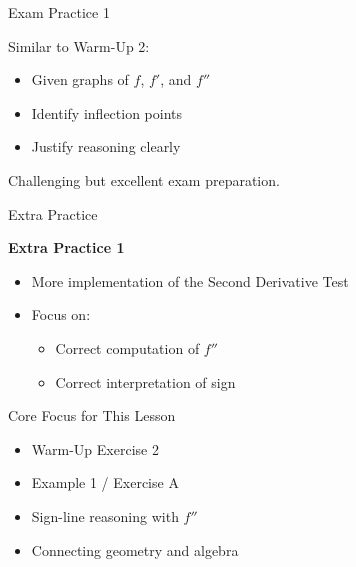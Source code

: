 \documentclass[dvipsnames]{beamer}
\begin{document}
\begin{frame}{Exam Practice 1}

Similar to Warm-Up 2:

\begin{itemize}
\item Given graphs of $f$, $f'$, and $f''$
\item Identify inflection points
\item Justify reasoning clearly
\end{itemize}

\medskip

\alert{Challenging but excellent exam preparation.}
\end{frame}

\begin{frame}{Extra Practice}

\textbf{Extra Practice 1}
\begin{itemize}
\item More implementation of the Second Derivative Test
\item Focus on:
\begin{itemize}
    \item Correct computation of $f''$
    \item Correct interpretation of sign
\end{itemize}
\end{itemize}
\end{frame}

\begin{frame}{Core Focus for This Lesson}

\begin{itemize}
\item Warm-Up Exercise 2
\item Example 1 / Exercise A
\item Sign-line reasoning with $f''$
\item Connecting geometry and algebra
\end{itemize}
\end{frame}
\end{document}

